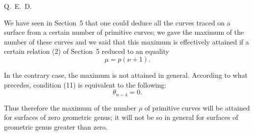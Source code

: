 \documentclass{article}
\begin{document}
Q.~E.~D.

We have seen in Section~5 that one could deduce all the curves traced on a surface from a certain number of primitive curves; we gave the maximum of the number of these curves and we said that this maximum is effectively attained if a certain relation (2) of Section~5 reduced to an equality
\[
\mu = p(\nu + 1). \tag{11}
\]

In the contrary case, the maximum is not attained in general. According to what precedes, condition (11) is equivalent to the following:
\[
\theta_{n-4} = 0.
\]

Thus therefore the maximum of the number $\rho$ of primitive curves will be attained for surfaces of zero geometric genus; it will not be so in general for surfaces of geometric genus greater than zero.
\end{document}
